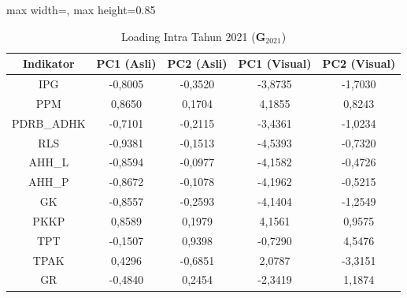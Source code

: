 \begin{table}[H]
\centering
\caption{Loading Intra Tahun 2021 ($\mathbf{G}_{2021}$)} \label{tab:app2loading_intra_2021}
\begin{adjustbox}{max width=\textwidth, max height=0.85\textheight}
\begin{tabular}{|c|c|c|c|c|}
\hline
\textbf{Indikator} & \textbf{PC1 (Asli)} & \textbf{PC2 (Asli)} & \textbf{PC1 (Visual)} & \textbf{PC2 (Visual)} \\
\hline
IPG & -0,8005 & -0,3520 & -3,8735 & -1,7030 \\
PPM & 0,8650 & 0,1704 & 4,1855 & 0,8243 \\
PDRB\_ADHK & -0,7101 & -0,2115 & -3,4361 & -1,0234 \\
RLS & -0,9381 & -0,1513 & -4,5393 & -0,7320 \\
AHH\_L & -0,8594 & -0,0977 & -4,1582 & -0,4726 \\
AHH\_P & -0,8672 & -0,1078 & -4,1962 & -0,5215 \\
GK & -0,8557 & -0,2593 & -4,1404 & -1,2549 \\
PKKP & 0,8589 & 0,1979 & 4,1561 & 0,9575 \\
TPT & -0,1507 & 0,9398 & -0,7290 & 4,5476 \\
TPAK & 0,4296 & -0,6851 & 2,0787 & -3,3151 \\
GR & -0,4840 & 0,2454 & -2,3419 & 1,1874 \\
\hline
\end{tabular}
\end{adjustbox}
\end{table}